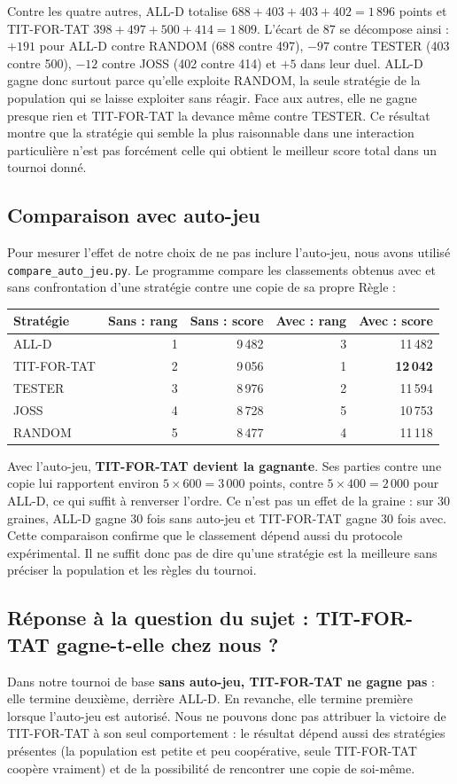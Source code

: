 \documentclass[10pt,a4paper]{article}
\begin{document}
Contre les quatre autres, ALL-D totalise $688+403+403+402=1\,896$ points et TIT-FOR-TAT $398+497+500+414=1\,809$. L'écart de 87
se décompose ainsi : $+191$ pour ALL-D contre RANDOM (688 contre 497), $-97$ contre TESTER (403 contre 500), $-12$ contre JOSS
(402 contre 414) et $+5$ dans leur duel. ALL-D gagne donc surtout parce qu'elle exploite RANDOM, la seule stratégie de la
population qui se laisse exploiter sans réagir. Face aux autres, elle ne gagne presque rien et TIT-FOR-TAT la devance même
contre TESTER. Ce résultat montre que la stratégie qui semble la plus raisonnable dans une interaction particulière n'est pas
forcément celle qui obtient le meilleur score total dans un tournoi donné.

\subsection{Comparaison avec auto-jeu}
Pour mesurer l'effet de notre choix de ne pas inclure l'auto-jeu, nous avons utilisé \texttt{compare\_auto\_jeu.py}. Le
programme compare les classements obtenus avec et sans confrontation d'une stratégie contre une copie de sa propre Règle :
\begin{center}
\small
\begin{tabular}{@{}lrrrr@{}}
\toprule
Stratégie & Sans : rang & Sans : score & Avec : rang & Avec : score \\
\midrule
ALL-D & 1 & 9\,482 & 3 & 11\,482 \\
TIT-FOR-TAT & 2 & 9\,056 & 1 & \textbf{12\,042} \\
TESTER & 3 & 8\,976 & 2 & 11\,594 \\
JOSS & 4 & 8\,728 & 5 & 10\,753 \\
RANDOM & 5 & 8\,477 & 4 & 11\,118 \\
\bottomrule
\end{tabular}
\end{center}

Avec l'auto-jeu, \textbf{TIT-FOR-TAT devient la gagnante}. Ses parties contre une copie lui rapportent environ
$5\times600=3\,000$ points, contre $5\times400=2\,000$ pour ALL-D, ce qui suffit à renverser l'ordre. Ce n'est pas un effet de
la graine : sur 30 graines, ALL-D gagne 30 fois sans auto-jeu et TIT-FOR-TAT gagne 30 fois avec. Cette comparaison confirme que le
classement dépend aussi du protocole expérimental. Il ne suffit donc pas de dire qu'une stratégie est \og la meilleure \fg{}
sans préciser la population et les règles du tournoi.

\subsection{Réponse à la question du sujet : TIT-FOR-TAT gagne-t-elle chez nous ?}
Dans notre tournoi de base \textbf{sans auto-jeu, TIT-FOR-TAT ne gagne pas} : elle termine deuxième, derrière ALL-D. En revanche,
elle termine première lorsque l'auto-jeu est autorisé. Nous ne pouvons donc pas attribuer la victoire de TIT-FOR-TAT à son seul
comportement : le résultat dépend aussi des stratégies présentes (la population est petite et peu coopérative, seule
TIT-FOR-TAT coopère vraiment) et de la possibilité de rencontrer une copie de soi-même.
\end{document}
